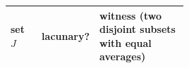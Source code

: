 \providecommand{\aqthreedata}{data/aq3/}
\footnotesize
\begin{tabular}{@{}llp{0.5\linewidth}@{}}
\toprule
set $J$ & lacunary? & witness (two disjoint subsets with equal averages)\\
\midrule

\end{tabular}
